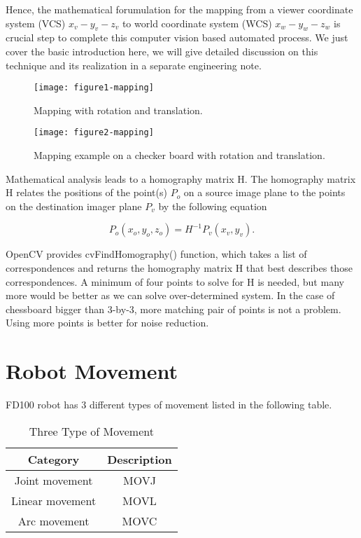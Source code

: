 \documentclass[conference]{IEEEtran}
\begin{document}
Hence, the mathematical forumulation for the mapping 
from a viewer coordinate system (VCS) $x_v-y_v-z_v$
to world coordinate system (WCS) $x_w-y_w-z_w$ is crucial 
step to complete this computer vision based automated 
process. We just cover the basic introduction here, 
we will give detailed discussion on this technique
and its realization in a separate engineering note.  

\begin{figure}[H] 
\centering
\texttt{[image: figure1-mapping]}  
\caption{Mapping with rotation and translation.}
\label{figure1-mapping} 
\end{figure}

\begin{figure}[H] 
\centering
\texttt{[image: figure2-mapping]}  
\caption{Mapping example on a checker board with rotation and translation.}
\label{figure12-mapping} 
\end{figure}

Mathematical analysis leads to a homography matrix H. 
The homography matrix H relates the positions of the point(s)
$P_{o}$ on a source image plane
to the points on the destination imager plane $P_{v}$ by 
the following equation

\begin{equation}
P_{o}(x_o,y_o,z_o) = H^{-1} P_v(x_v,y_v) . 
\end{equation}
 
OpenCV provides cvFindHomography() function, which takes a list of
correspondences and returns the homography matrix H that best describes those 
correspondences. 
A minimum of four points to solve for H is needed, but many
more would be better as we can solve over-determined 
system. In the case of chessboard bigger than 3-by-3, 
more matching pair of points is not a problem. Using more
points is better for noise reduction. 

\section{Robot Movement}
 
FD100 robot has 3 different types of movement listed in the 
following table. 
\begin{table}[H] %
\renewcommand{\arraystretch}{1.3} 
\caption{Three Type of Movement}
\label{Table1-movement}
\centering 
\begin{tabular}{|c||c|}
\hline
Category         & Description   \\
\hline
\hline
Joint movement  & MOVJ \\
\hline
Linear movement & MOVL \\
\hline
Arc movement    & MOVC \\
\hline
\hline
\end{tabular}
\end{table}
 
\end{document}
